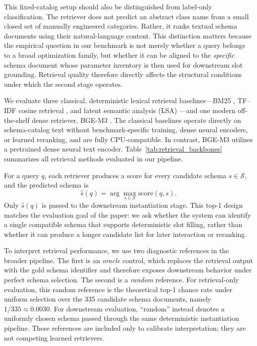 \documentclass[3p]{elsarticle}
\begin{document}
This fixed-catalog setup should also be distinguished from label-only classification. The retriever does not predict an abstract class name from a small closed set of manually engineered categories. Rather, it ranks textual schema documents using their natural-language content. This distinction matters because the empirical question in our benchmark is not merely whether a query belongs to a broad optimization family, but whether it can be aligned to the \emph{specific} schema document whose parameter inventory is then used for downstream slot grounding. Retrieval quality therefore directly affects the structural conditions under which the second stage operates.

We evaluate three classical, deterministic lexical retrieval baselines---BM25 \cite{robertson2009bm25}, TF--IDF cosine retrieval \cite{pedregosa2011sklearn}, and latent semantic analysis (LSA) \cite{deerwester1990lsa}---and one modern off-the-shelf dense retriever, BGE-M3 \cite{chen2024m3embedding}. The classical baselines operate directly on schema-catalog text without benchmark-specific training, dense neural encoders, or learned reranking, and are fully CPU-compatible. In contrast, BGE-M3 utilizes a pretrained dense neural text encoder. Table~\ref{tab:retrieval_backbones} summarizes all retrieval methods evaluated in our pipeline.

For a query $q$, each retriever produces a score for every candidate schema $s \in \mathcal{S}$, and the predicted schema is
\begin{equation}
\hat{s}(q) = \arg\max_{s \in \mathcal{S}} \mathrm{score}(q,s).
\label{eq:schema_retrieval}
\end{equation}
Only $\hat{s}(q)$ is passed to the downstream instantiation stage. This top-1 design matches the evaluation goal of the paper: we ask whether the system can identify a single compatible schema that supports deterministic slot filling, rather than whether it can produce a longer candidate list for later interaction or reranking.

To interpret retrieval performance, we use two diagnostic references in the broader pipeline. The first is an \emph{oracle} control, which replaces the retrieval output with the gold schema identifier and therefore exposes downstream behavior under perfect schema selection. The second is a \emph{random} reference. For retrieval-only evaluation, this random reference is the theoretical top-1 chance rate under uniform selection over the 335 candidate schema documents, namely $1/335 \approx 0.0030$. For downstream evaluation, ``random'' instead denotes a uniformly chosen schema passed through the same deterministic instantiation pipeline. These references are included only to calibrate interpretation; they are not competing learned retrievers.
\end{document}

